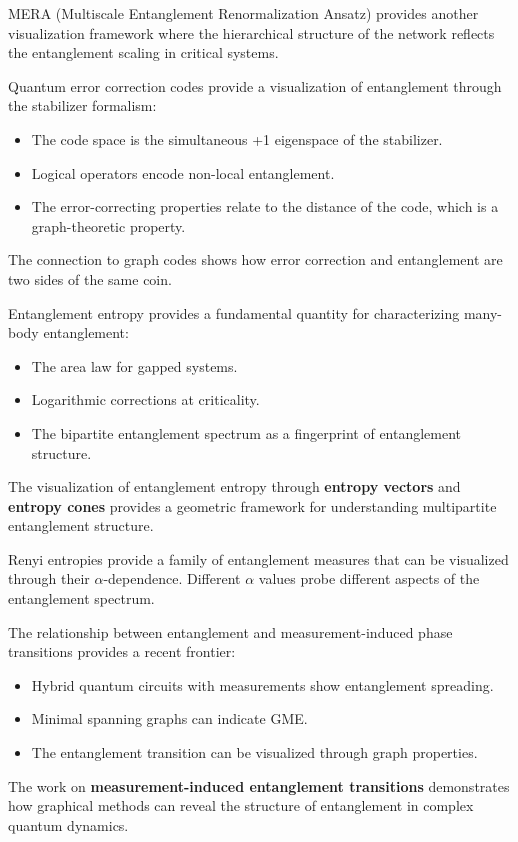 \documentclass[12pt,a4paper]{article}
\begin{document}
MERA (Multiscale Entanglement Renormalization Ansatz) provides another visualization framework where the hierarchical structure of the network reflects the entanglement scaling in critical systems.

Quantum error correction codes provide a visualization of entanglement through the stabilizer formalism:
\begin{itemize}
	\item The code space is the simultaneous +1 eigenspace of the stabilizer.
	\item Logical operators encode non-local entanglement.
	\item The error-correcting properties relate to the distance of the code, which is a graph-theoretic property.
\end{itemize}

The connection to graph codes shows how error correction and entanglement are two sides of the same coin.

Entanglement entropy provides a fundamental quantity for characterizing many-body entanglement:
\begin{itemize}
	\item The area law for gapped systems.
	\item Logarithmic corrections at criticality.
	\item The bipartite entanglement spectrum as a fingerprint of entanglement structure.
\end{itemize}

The visualization of entanglement entropy through \textbf{entropy vectors} and \textbf{entropy cones} provides a geometric framework for understanding multipartite entanglement structure.

Renyi entropies provide a family of entanglement measures that can be visualized through their $\alpha$-dependence. Different $\alpha$ values probe different aspects of the entanglement spectrum.

The relationship between entanglement and measurement-induced phase transitions provides a recent frontier:
\begin{itemize}
	\item Hybrid quantum circuits with measurements show entanglement spreading.
	\item Minimal spanning graphs can indicate GME.
	\item The entanglement transition can be visualized through graph properties.
\end{itemize}

The work on \textbf{measurement-induced entanglement transitions} \cite{SpanningGraphs2025} demonstrates how graphical methods can reveal the structure of entanglement in complex quantum dynamics.
\end{document}
